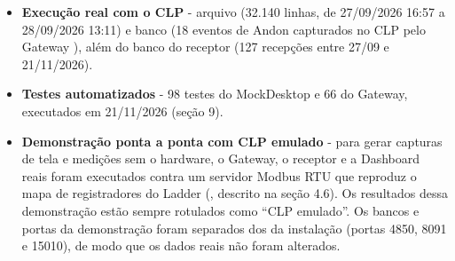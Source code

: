 \begin{itemize}
    \item \textbf{Execução real com o CLP} - arquivo  (32.140 linhas, de 27/09/2026 16:57 a 28/09/2026 13:11) e banco  (18 eventos de Andon capturados no CLP pelo Gateway ), além do banco do receptor  (127 recepções entre 27/09 e 21/11/2026).
    \item \textbf{Testes automatizados} - 98 testes do MockDesktop e 66 do Gateway, executados em 21/11/2026 (seção 9).
    \item \textbf{Demonstração ponta a ponta com CLP emulado} - para gerar capturas de tela e medições sem o hardware, o Gateway, o receptor e a Dashboard reais foram executados contra um servidor Modbus RTU que reproduz o mapa de registradores do Ladder (, descrito na seção 4.6). Os resultados dessa demonstração estão sempre rotulados como ``CLP emulado''. Os bancos e portas da demonstração foram separados dos da instalação (portas 4850, 8091 e 15010), de modo que os dados reais não foram alterados.
\end{itemize}
